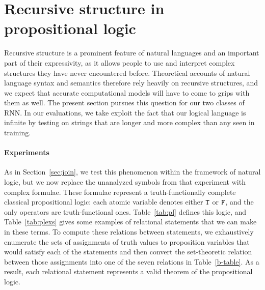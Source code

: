 \section{Recursive structure in propositional logic}\label{sec:recursion}

Recursive structure is a prominent feature of natural languages and an
important part of their expressivity, as it allows people to use and
interpret complex structures they have never encountered before.
Theoretical accounts of natural language syntax and semantics
therefore rely heavily on recursive structures, and we expect that
accurate computational models will have to come to grips with them as
well. The present section pursues this question for our two classes of
RNN. In our evaluations, we take exploit the fact that our logical
language is infinite by testing on strings that are longer and more
complex than any seen in training.


\paragraph{Experiments}
As in Section~\ref{sec:join}, we test this phenomenon within the
framework of natural logic, but we now replace the unanalyzed symbols
from that experiment with complex formulae. These formulae
represent a truth-functionally complete classical propositional logic:
each atomic variable denotes either $\texttt{T}$ or $\texttt{F}$, and the only
operators are truth-functional ones.  Table~\ref{tab:pl} defines this
logic, and Table~\ref{tab:plexs} gives some examples of relational
statements that we can make in these terms. To compute these relations
between statements, we exhaustively enumerate the sets of assignments
of truth values to proposition variables that would satisfy each of
the statements and then convert the set-theoretic relation between
those assignments into one of the seven relations in
Table~\ref{b-table}. As a result, each relational statement represents
a valid theorem of the propositional logic.

